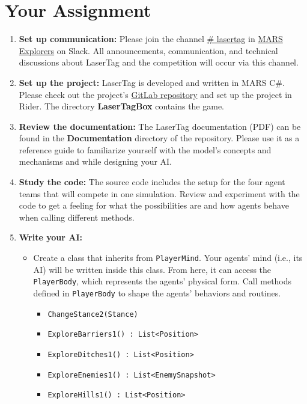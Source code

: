 \documentclass[
    a4paper,
    english,
    DIV=16,
    11pt,
    parskip=half,
]{scrartcl}
\begin{document}
\section*{Your Assignment}
\begin{enumerate}
    \item \textbf{Set up communication:} Please join the channel \underline{\# lasertag} in
    \href{https://join.slack.com/t/mars-explorers/shared_invite/zt-recgxwyo-WWOpjkLFq69CxQtSrlBIxw}{MARS Explorers} on Slack. All announcements, communication, and technical discussions about LaserTag and the competition will occur via this channel.
    \item \textbf{Set up the project:} LaserTag is developed and written in MARS C\#. Please check out the project's \href{https://git.haw-hamburg.de/mars/mars-laser-tag-game}{GitLab repository} and set up the project in Rider. The directory \textbf{LaserTagBox} contains the game.
    \item \textbf{Review the documentation:} The LaserTag documentation (PDF) can be found in the \textbf{Documentation} directory of the repository. Please use it as a reference guide to familiarize yourself with the model's concepts and mechanisms and while designing your AI.
    \item \textbf{Study the code:} The source code includes the setup for the four agent teams that will compete in one simulation. Review and experiment with the code to get a feeling for what the possibilities are and how agents behave when calling different methods.
    \item \textbf{Write your AI:}
    \begin{itemize}
        \item Create a class that inherits from \texttt{PlayerMind}. Your agents' mind (i.e., its AI) will be written inside this class. From here, it can access the \texttt{PlayerBody}, which represents the agents' physical form. Call methods defined in \texttt{PlayerBody} to shape the agents' behaviors and routines. 
        \begin{itemize}
            \item \texttt{ChangeStance2(Stance)}
            \item \texttt{ExploreBarriers1() : List<Position>}
            \item \texttt{ExploreDitches1() : List<Position>}
            \item \texttt{ExploreEnemies1() : List<EnemySnapshot>}
            \item \texttt{ExploreHills1() : List<Position>}

\end{itemize}
\end{itemize}
\end{enumerate}
\end{document}
